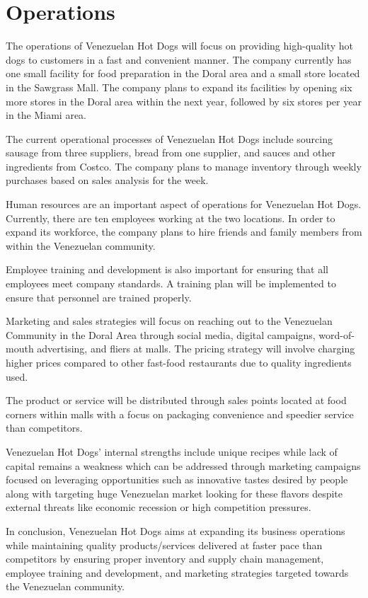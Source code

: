 \section{Operations}\label{sec:operations}

The operations of Venezuelan Hot Dogs will focus on providing high-quality hot dogs to customers in a fast and convenient manner. The company currently has one small facility for food preparation in the Doral area and a small store located in the Sawgrass Mall. The company plans to expand its facilities by opening six more stores in the Doral area within the next year, followed by six stores per year in the Miami area.

The current operational processes of Venezuelan Hot Dogs include sourcing sausage from three suppliers, bread from one supplier, and sauces and other ingredients from Costco. The company plans to manage inventory through weekly purchases based on sales analysis for the week.

Human resources are an important aspect of operations for Venezuelan Hot Dogs. Currently, there are ten employees working at the two locations. In order to expand its workforce, the company plans to hire friends and family members from within the Venezuelan community.

Employee training and development is also important for ensuring that all employees meet company standards. A training plan will be implemented to ensure that personnel are trained properly.

Marketing and sales strategies will focus on reaching out to the Venezuelan Community in the Doral Area through social media, digital campaigns, word-of-mouth advertising, and fliers at malls. The pricing strategy will involve charging higher prices compared to other fast-food restaurants due to quality ingredients used.

The product or service will be distributed through sales points located at food corners within malls with a focus on packaging convenience and speedier service than competitors. 

Venezuelan Hot Dogs' internal strengths include unique recipes while lack of capital remains a weakness which can be addressed through marketing campaigns focused on leveraging opportunities such as innovative tastes desired by people along with targeting huge Venezuelan market looking for these flavors despite external threats like economic recession or high competition pressures.

In conclusion, Venezuelan Hot Dogs aims at expanding its business operations while maintaining quality products/services delivered at faster pace than competitors by ensuring proper inventory and supply chain management, employee training and development, and marketing strategies targeted towards the Venezuelan community.